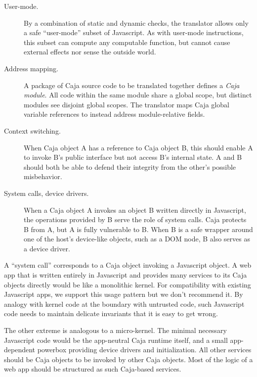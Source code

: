\documentclass[letterpaper,twocolumn,10pt]{article}
\begin{document}
\begin{description}

  \item[User-mode.] By a combination of static and dynamic checks, the 
  translator allows only a safe ``user-mode'' subset of Javascript. As with 
  user-mode instructions, this subset can compute any computable function, 
  but cannot cause external effects nor sense the outside world.

  \item[Address mapping.] A package of Caja source code to be translated 
  together defines a \emph{Caja module}. All code within the same module 
  share a global scope, but distinct modules see disjoint global scopes. The 
  translator maps Caja global variable references to instead address 
  module-relative fields.

  \item[Context switching.] When Caja object A has a reference to Caja 
  object B, this should enable A to invoke B's public interface but not 
  access B's internal state. A and B should both be able to defend their 
  integrity from the other's possible misbehavior.

  \item[System calls, device drivers.] When a Caja object A invokes an 
  object B written directly in Javascript, the operations provided by B serve 
  the role of system calls. Caja protects B from A, but A is fully 
  vulnerable to B. When B is a safe wrapper around one of the host's 
  device-like objects, such as a DOM node, B also serves as a device driver.

\end{description}

A ``system call'' corresponds to a Caja object invoking a Javascript object. 
A web app that is written entirely in Javascript and provides many services 
to its Caja objects directly would be like a monolithic kernel. For 
compatibility with existing Javascript apps, we support this usage pattern 
but we don't recommend it. By analogy with kernel code at the boundary with 
untrusted code, such Javascript code needs to maintain delicate invariants 
that it is easy to get wrong.

The other extreme is analogous to a micro-kernel. The minimal necessary 
Javascript code would be the app-neutral Caja runtime itself, and a small 
app-dependent powerbox providing device drivers and initialization. All other 
services should be Caja objects to be invoked by other Caja objects. Most 
of the logic of a web app should be structured as such Caja-based services.
\end{document}
